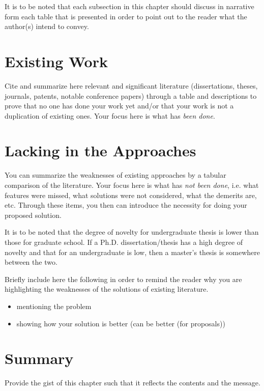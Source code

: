 It is to be noted that each subsection in this chapter should discuss in narrative form each table that is presented in order to point out to the reader what the author(s) intend to convey.

\section{Existing Work}

Cite and summarize here relevant and significant literature (dissertations, theses, journals, patents, notable conference papers) through a table and descriptions to prove that no one has done your work yet and/or that your work is not a duplication of existing ones. Your focus here is what has \emph{been done}.

\graytx{\Blindtext}

\section{Lacking in the Approaches}

You can summarize the weaknesses of existing approaches by a tabular comparison of the literature. Your focus here is what has \emph{not been done}, i.e. what features were missed, what solutions were not considered, what the demerits are, etc.  Through these items, you then can introduce the necessity for doing your proposed solution.  

It is to be noted that the degree of novelty for undergraduate thesis is lower than those for graduate school. If a Ph.D. dissertation/thesis has a high degree of novelty and that for an undergraduate is low, then a master's thesis is somewhere between the two.

Briefly include here the following in order to remind the reader why you are highlighting the weaknesses of the solutions of existing literature. 

\begin{itemize}
	\item mentioning the problem
	\item showing how your solution is better (can be better (for proposals))
\end{itemize}


\graytx{\Blindtext}

\section{Summary}

Provide the gist of this chapter such that it reflects the contents and the message.




